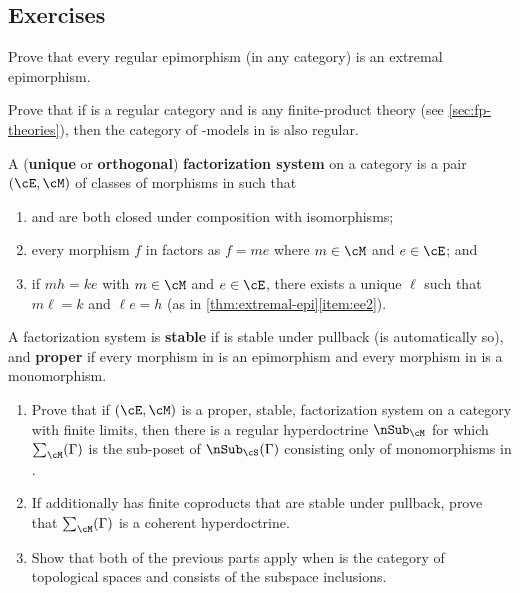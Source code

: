 \subsection*{Exercises}

\begin{ex}\label{ex:regular-epis}
  Prove that every regular epimorphism (in any category) is an extremal epimorphism.
\end{ex}

\begin{ex}\label{ex:regular-egs}
  Prove that if \cS is a regular category and \cT is any finite-product theory (see \cref{sec:fp-theories}), then the category of \cT-models in \cS is also regular.
\end{ex}

\begin{ex}\label{ex:factsys}
  A (\textbf{unique} or \textbf{orthogonal}) \textbf{factorization system} on a category \cS is a pair $(\cE,\cM)$ of classes of morphisms in \cS such that
  \begin{enumerate}
  \item \cE and \cM are both closed under composition with isomorphisms;
  \item every morphism $f$ in \cS factors as $f=m e$ where $m\in\cM$ and $e\in\cE$; and
  \item if $m h = k e$ with $m\in\cM$ and $e\in \cE$, there exists a unique $\ell$ such that $m\ell=k$ and $\ell e = h$ (as in \cref{thm:extremal-epi}\ref{item:ee2}).
  \end{enumerate}
  A factorization system is \textbf{stable} if \cE is stable under pullback (\cM is automatically so), and \textbf{proper} if every morphism in \cE is an epimorphism and every morphism in \cM is a monomorphism.
  \begin{enumerate}
  \item Prove that if $(\cE,\cM)$ is a proper, stable, factorization system on a category \cS with finite limits, then there is a regular hyperdoctrine $\sub_\cM$ for which $\sum_\cM(\Gamma)$ is the sub-poset of $\sub_\cS(\Gamma)$ consisting only of monomorphisms in \cM.
  \item If \cS additionally has finite coproducts that are stable under pullback, prove that $\sum_\cM(\Gamma)$ is a coherent hyperdoctrine.
  \item Show that both of the previous parts apply when \cS is the category of topological spaces and \cM consists of the subspace inclusions.
  \end{enumerate}
\end{ex}

